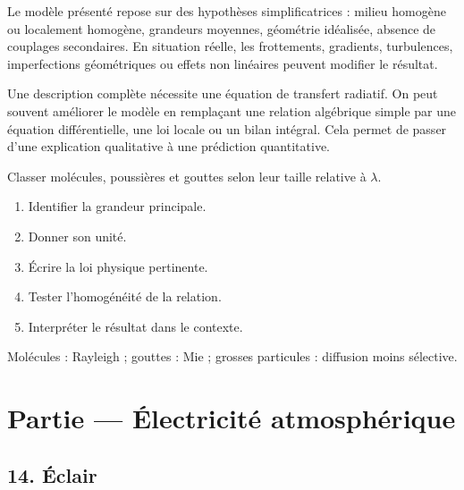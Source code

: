 \documentclass[11pt,a4paper]{article}
\begin{document}
\begin{attentionbox}
Le modèle présenté repose sur des hypothèses simplificatrices : milieu homogène ou localement homogène, grandeurs moyennes, géométrie idéalisée, absence de couplages secondaires. En situation réelle, les frottements, gradients, turbulences, imperfections géométriques ou effets non linéaires peuvent modifier le résultat.
\end{attentionbox}

\begin{approfondissementbox}
Une description complète nécessite une équation de transfert radiatif.
On peut souvent améliorer le modèle en remplaçant une relation algébrique simple par une équation différentielle, une loi locale ou un bilan intégral. Cela permet de passer d'une explication qualitative à une prédiction quantitative.
\end{approfondissementbox}

\begin{exercicebox}
Classer molécules, poussières et gouttes selon leur taille relative à $\lambda$.
\begin{enumerate}
  \item Identifier la grandeur principale.
  \item Donner son unité.
  \item Écrire la loi physique pertinente.
  \item Tester l'homogénéité de la relation.
  \item Interpréter le résultat dans le contexte.
\end{enumerate}
\end{exercicebox}

\begin{corrigebox}[Indication]
Molécules : Rayleigh ; gouttes : Mie ; grosses particules : diffusion moins sélective.
\end{corrigebox}


\section{Partie — Électricité atmosphérique}


\subsection{14. Éclair}
\end{document}
